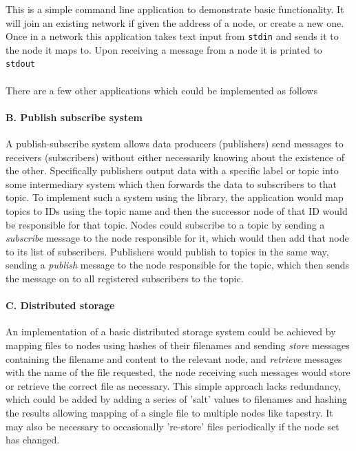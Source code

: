 \documentclass{article}
\begin{document}
This is a simple command line application to demonstrate basic functionality. It will join an existing network if given the address of a node, or create a new one. Once in a network this application takes text input from \texttt{stdin} and sends it to the node it maps to. Upon receiving a message from a node it is printed to \texttt{stdout}
\\
\\

\noindent
There are a few other applications which could be implemented as follows

\paragraph{B. Publish subscribe system} A publish-subscribe system allows data producers (publishers) send messages to receivers (subscribers) without either necessarily knowing about the existence of the other. Specifically publishers output data with a specific label or topic into some intermediary system which then forwards the data to subscribers to that topic.
To implement such a system using the library, the application would map topics to IDs using the topic name and then the successor node of that ID would be responsible for that topic. Nodes could subscribe to a topic by sending a \textit{subscribe} message to the node responsible for it, which would then add that node to its list of subscribers. Publishers would publish to topics in the same way, sending a \textit{publish} message to the node responsible for the topic, which then sends the message on to all registered subscribers to the topic.


\paragraph{C. Distributed storage} An implementation of a basic distributed storage system could be achieved by mapping files to nodes using hashes of their filenames and sending \textit{store} messages containing the filename and content to the relevant node, and \textit{retrieve} messages with the name of the file requested, the node receiving such messages would store or retrieve the correct file as necessary. This simple approach lacks redundancy, which could be added by adding a series of 'salt' values to filenames and hashing the results allowing mapping of a single file to multiple nodes like tapestry. It may also be necessary to occasionally 're-store' files periodically if the node set has changed.
\end{document}
